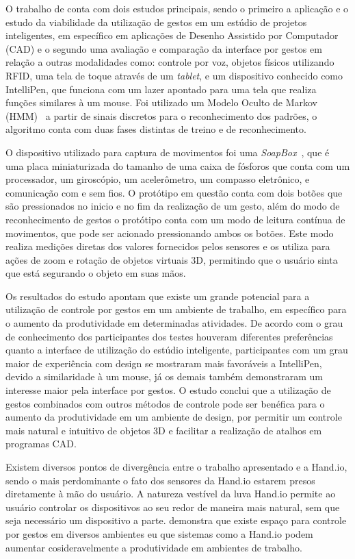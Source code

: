 O trabalho de  conta com dois estudos principais, sendo o primeiro a aplicação e o estudo da viabilidade da utilização de gestos em um estúdio de projetos inteligentes, em específico em aplicações de Desenho Assistido por Computador (CAD) e o segundo uma avaliação e comparação da interface por gestos em relação a outras modalidades como: controle por voz, objetos físicos utilizando RFID, uma tela de toque através de um \textit{tablet}, e um dispositivo conhecido como IntelliPen, que funciona com um lazer apontado para uma tela que realiza funções similares à um mouse. Foi utilizado um Modelo Oculto de Markov (HMM)~\cite{hmm:1989} a partir de sinais discretos para o reconhecimento dos padrões, o algoritmo conta com duas fases distintas de treino e de reconhecimento.


O dispositivo utilizado para captura de movimentos foi uma \textit{SoapBox}~\cite{soapbox:2002}, que é uma placa miniaturizada do tamanho de uma caixa de fósforos que conta com um processador, um giroscópio, um acelerômetro, um compasso eletrônico, e comunicação com e sem fios. O protótipo em questão conta com dois botões que são pressionados no inicio e no fim da realização de um gesto, além do modo de reconhecimento de gestos o protótipo conta com um modo de leitura contínua de movimentos, que pode ser acionado pressionando ambos os botões. Este modo realiza medições diretas dos valores fornecidos pelos sensores e os utiliza para ações de zoom e rotação de objetos virtuais 3D, permitindo que o usuário sinta que está segurando o objeto em suas mãos.

Os resultados do estudo apontam que existe um grande potencial para a utilização de controle por gestos em um ambiente de trabalho, em específico para o aumento da produtividade em determinadas atividades. De acordo com o grau de conhecimento dos participantes dos testes houveram diferentes preferências quanto a interface de utilização do estúdio inteligente, participantes com um grau maior de experiência com design se mostraram mais favoráveis a IntelliPen, devido a similaridade à um mouse, já os demais também demonstraram um interesse maior pela interface por gestos. 
% 
O estudo conclui que a utilização de gestos combinados com outros métodos de controle pode ser benéfica para o aumento da produtividade em um ambiente de design, por permitir um controle mais natural e intuitivo de objetos 3D e facilitar a realização de atalhos em programas CAD.

Existem diversos pontos de divergência entre o trabalho apresentado e a Hand.io, sendo o mais perdominante o fato dos sensores da Hand.io estarem presos diretamente à mão do usuário. A natureza vestível da luva Hand.io permite ao usuário controlar os dispositivos ao seu redor de maneira mais natural, sem que seja necessário um dispositivo a parte.  demonstra que existe espaço para controle por gestos em diversos ambientes eu que sistemas como a Hand.io podem aumentar cosideravelmente a produtividade em ambientes de trabalho.

